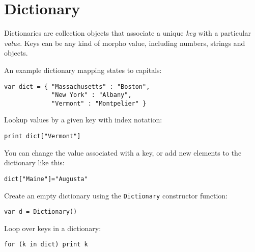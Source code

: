 \hypertarget{dictionary}{%
\section{Dictionary}\label{dictionary}}

Dictionaries are collection objects that associate a unique \emph{key}
with a particular \emph{value}. Keys can be any kind of morpho value,
including numbers, strings and objects.

An example dictionary mapping states to capitals:

\begin{lstlisting}
var dict = { "Massachusetts" : "Boston",
             "New York" : "Albany",
             "Vermont" : "Montpelier" }
\end{lstlisting}

Lookup values by a given key with index notation:

\begin{lstlisting}
print dict["Vermont"]
\end{lstlisting}

You can change the value associated with a key, or add new elements to
the dictionary like this:

\begin{lstlisting}
dict["Maine"]="Augusta"
\end{lstlisting}

Create an empty dictionary using the \texttt{Dictionary} constructor
function:

\begin{lstlisting}
var d = Dictionary()
\end{lstlisting}

Loop over keys in a dictionary:

\begin{lstlisting}
for (k in dict) print k
\end{lstlisting}
